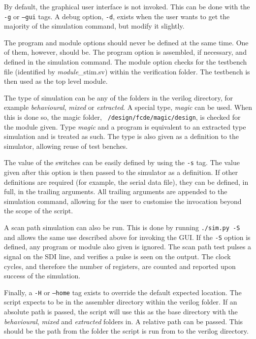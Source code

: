By default, the graphical user interface is not invoked. 
This can be done with the \texttt{-g} or \texttt{--gui} tags. 
A debug option, \texttt{-d}, exists when the user wants to get the majority of the simulation command, but modify it slightly. 

The program and module options should never be defined at the same time. 
One of them, however, should be. 
The program option is assembled, if necessary, and defined in the simulation command. 
The module option checks for the testbench file (identified by \textit{module}\_stim.sv) within the verification folder. 
The testbench is then used as the top level module. 

The type of simulation can be any of the folders in the verilog directory, for example \textit{behavioural}, \textit{mixed} or \textit{extracted}. 
A special type, \textit{magic} can be used.
When this is done so, the magic folder, \texttt{~/design/fcde/magic/design}, is checked for the module given. 
Type \textit{magic} and a program is equivalent to an extracted type simulation and is treated as such. 
The type is also given as a definition to the simulator, allowing reuse of test benches. 

The value of the switches can be easily defined by using the \texttt{-s} tag. 
The value given after this option is then passed to the simulator as a definition. 
If other definitions are required (for example, the serial data file), they can be defined, in full, in the trailing arguments. 
All trailing arguments are appended to the simulation command, allowing for the user to customise the invocation beyond the scope of the script. 

A scan path simulation can also be run.
This is done by running \texttt{./sim.py -S} and allows the same use described above for invoking the GUI.
If the \texttt{-S} option is defined, any program or module also given is ignored.
The scan path test pulses a signal on the SDI line, and verifies a pulse is seen on the output. 
The clock cycles, and therefore the number of registers, are counted and reported upon success of the simulation.



Finally, a \texttt{-H} or \texttt{--home} tag exists to override the default expected location. 
The script expects to be in the assembler directory within the verilog folder. 
If an absolute path is passed, the script will use this as the base directory with the \textit{behavioural}, \textit{mixed} and \textit{extracted} folders in.
A relative path can be passed. 
This should be the path from the folder the script is run from to the verilog directory. 

